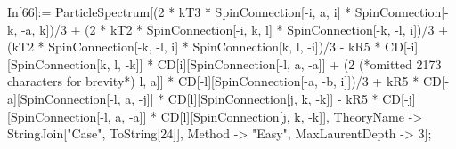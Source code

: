 In[66]:= ParticleSpectrum[(2 * kT3 * SpinConnection[-i, a, i] * SpinConnection[-k, -a, k])/3 + (2 * kT2 * SpinConnection[-i, k, l] * SpinConnection[-k, -l, i])/3 + (kT2 * SpinConnection[-k, -l, i] * SpinConnection[k, l, -i])/3 - kR5 * CD[-i][SpinConnection[k, l, -k]] * CD[i][SpinConnection[-l, a, -a]] + (2 (*omitted 2173 characters for brevity*) l, a]] * CD[-l][SpinConnection[-a, -b, i]])/3 + kR5 * CD[-a][SpinConnection[-l, a, -j]] * CD[l][SpinConnection[j, k, -k]] - kR5 * CD[-j][SpinConnection[-l, a, -a]] * CD[l][SpinConnection[j, k, -k]], TheoryName -> StringJoin["Case", ToString[24]], Method -> "Easy", MaxLaurentDepth -> 3];